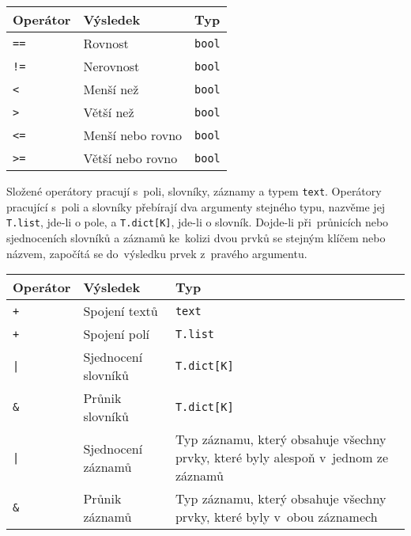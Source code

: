 \documentclass[a4paper,12pt]{article}
\begin{document}
\begin{tabular}{|m{1.5cm} m{5cm} m{8cm}|}\hline
Operátor & Výsledek & Typ\\\hline
\texttt{==} & Rovnost & \texttt{bool}\\\hline
\texttt{!=} & Nerovnost & \texttt{bool}\\\hline
\texttt{<} & Menší než & \texttt{bool}\\\hline
\texttt{>} & Větší než & \texttt{bool}\\\hline
\texttt{<=} & Menší nebo rovno & \texttt{bool}\\\hline
\texttt{>=} & Větší nebo rovno &\texttt{bool}\\\hline
\end{tabular}

Složené operátory pracují s~poli, slovníky, záznamy a typem \texttt{text}. Operátory pracující s~poli a slovníky přebírají dva argumenty stejného typu, nazvěme jej \texttt{T.list}, jde-li o pole, a \texttt{T.dict[K]}, jde-li o slovník. Dojde-li při~průnicích nebo sjednoceních slovníků a záznamů ke~kolizi dvou prvků se stejným klíčem nebo názvem, započítá se do~výsledku prvek z~pravého argumentu.

\begin{tabular}{|m{1.5cm} m{5cm} m{8cm}|}\hline
Operátor & Výsledek & Typ\\\hline
\texttt{+} & Spojení textů & \texttt{text}\\\hline
\texttt{+} & Spojení polí & \texttt{T.list}\\\hline
\texttt{|} & Sjednocení slovníků & \texttt{T.dict[K]}\\\hline
\texttt{\&} & Průnik slovníků & \texttt{T.dict[K]}\\\hline
\texttt{|} & Sjednocení záznamů & Typ záznamu, který obsahuje všechny prvky, které byly alespoň v~jednom ze záznamů\\\hline
\texttt{\&} & Průnik záznamů & Typ záznamu, který obsahuje všechny prvky, které byly v~obou záznamech\\\hline
\end{tabular}
\end{document}
